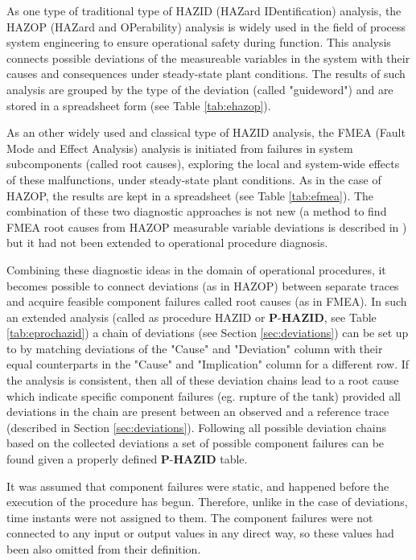 \documentclass[conference]{IEEEtran}
\begin{document}
As one type of traditional type of HAZID (HAZard IDentification) analysis, the HAZOP (HAZard and OPerability) analysis is widely used in the field of process system engineering to ensure operational safety during function. This analysis connects possible deviations of the measureable variables in the system with their causes and consequences under steady-state plant conditions. The results of such analysis are grouped by the type of the deviation (called "guideword") and are stored in a spreadsheet form (see Table \ref{tab:ehazop}). 

As an other widely used and classical type of HAZID analysis, the FMEA (Fault Mode and Effect Analysis) analysis is initiated from failures in system subcomponents (called root causes), exploring the local and system-wide effects of these malfunctions, under steady-state plant conditions. As in the case of HAZOP, the results are kept in a spreadsheet (see Table \ref{tab:efmea}). The combination of these two diagnostic approaches is not new (a method to find FMEA root causes from HAZOP measurable variable deviations is described in \cite{com_hazop_fmea}) but it had not been extended to operational procedure diagnosis.

Combining these diagnostic ideas in the domain of operational procedures, it becomes possible to connect deviations (as in HAZOP) between separate traces and acquire feasible component failures called root causes (as in FMEA). In such an extended analysis (called as procedure HAZID or  $\textbf{P-HAZID}$, see Table \ref{tab:eprochazid}) a chain of deviations (see Section \ref{sec:deviations}) can be set up to by matching deviations of the "Cause" and "Deviation" column with their equal counterparts in the "Cause" and "Implication" column for a different row. If the analysis is consistent, then all of these deviation chains lead to a root cause which indicate specific component failures (eg. rupture of the tank) provided all deviations in the chain are present between an observed and a reference trace (described in Section \ref{sec:deviations}). Following all possible deviation chains based on the collected deviations a set of possible component failures can be found given a properly defined $\textbf{P-HAZID}$ table. 

It was assumed that component failures were static, and happened before the execution of the procedure has begun. Therefore, unlike in the case of deviations, time instants were not assigned to them. The component failures were not connected to any input or output values in any direct way, so these values had been also omitted from their definition. 
\end{document}

